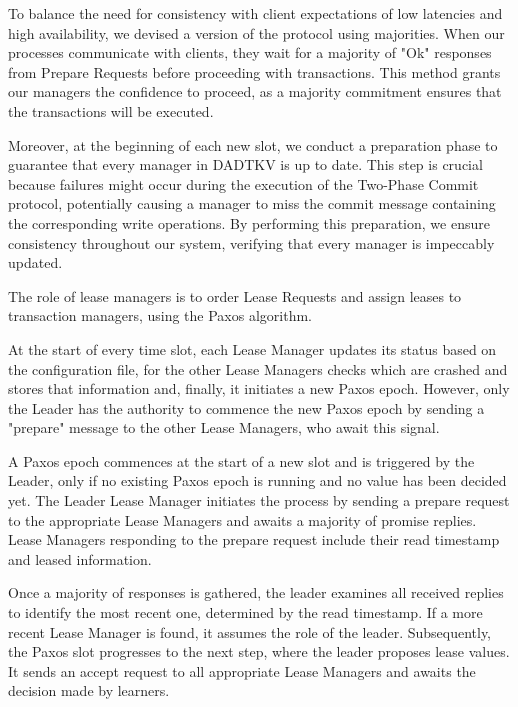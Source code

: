 \documentclass[times, 10pt,twocolumn]{article}
\begin{document}
To balance the need for consistency with client expectations of 
low latencies and high availability, we devised a version
of the protocol using majorities. When our processes communicate 
with clients, they wait for a majority of "Ok" responses from Prepare 
Requests before proceeding with transactions. This method grants our
managers the confidence to proceed, as a majority commitment ensures 
that the transactions will be executed.

Moreover, at the beginning of each new slot, we conduct a preparation 
phase to guarantee that every manager in DADTKV is up to date. This 
step is crucial because failures might occur during the execution 
of the Two-Phase Commit protocol, potentially causing a manager 
to miss the commit message containing the corresponding write 
operations. By performing this preparation, we ensure consistency 
throughout our system, verifying that every manager is impeccably updated.



The role of lease managers is to order Lease Requests and assign 
leases to transaction managers, using the Paxos algorithm. 

At the start of every time slot, each Lease Manager updates its 
status based on the configuration file, for the other Lease Managers 
checks which are crashed and stores that information and, finally, 
it initiates a new Paxos epoch. However, only the Leader has the 
authority to commence the new Paxos epoch by sending a "prepare"
message to the other Lease Managers, who await this signal.

A Paxos epoch commences at the start of a new slot and is triggered 
by the Leader, only if no existing Paxos epoch is running and no 
value has been decided yet. The Leader Lease Manager initiates 
the process by sending a prepare request to the appropriate Lease 
Managers and awaits a majority of promise replies. Lease Managers 
responding to the prepare request include their read timestamp and 
leased information.

Once a majority of responses is gathered, the leader examines all 
received replies to identify the most recent one, determined by the 
read timestamp. If a more recent Lease Manager is found, it assumes 
the role of the leader. Subsequently, the Paxos slot progresses to 
the next step, where the leader proposes lease values. It sends an 
accept request to all appropriate Lease Managers and awaits the decision 
made by learners.
\end{document}
